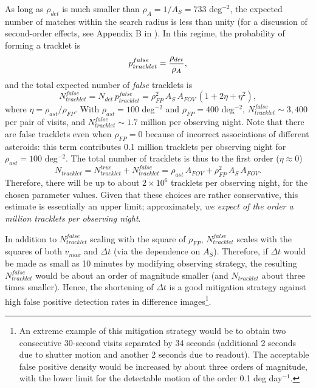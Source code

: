 As long as $\rho_{det}$ is much smaller than $\rho_A = 1/A_S = 733$ deg$^{-2}$, the expected number of 
matches within the search radius is less than unity (for a discussion of second-order effects, see Appendix B 
in \citealt{IVLZ2005}). In this regime, the probability of forming a tracklet is 
\begin{equation}
                 p_{tracklet}^{false} =   { \rho_{det}  \over \rho_A}, 
\end{equation}
and the total expected number of {\it false} tracklets is 
\begin{equation}
           N_{tracklet}^{false} = N_{det} \, p_{tracklet}^{false} =  \rho^2_{FP}  \, A_S \, A_{FOV} \,
                                \left(1 + 2 \eta + \eta^2\right),
\end{equation}
where $\eta = \rho_{ast}  / \rho_{FP}$. With $\rho_{ast} = 100$ deg$^{-2}$ and  $\rho_{FP} = 400$ deg$^{-2}$,
$N_{tracklet}^{false} \sim 3,400$ per pair of visits, and $N_{tracklet}^{false} \sim 1.7$ million per observing night. 
Note that there are false tracklets even when $\rho_{FP} = 0$ because of incorrect associations of different asteroids:
this term contributes 0.1 million tracklets per observing night for $\rho_{ast} = 100$ deg$^{-2}$. The total
number of tracklets is thus to the first order ($\eta \approx 0$)
\begin{equation}
   N_{tracklet} =  N_{tracklet}^{true} + N_{tracklet}^{false} = \rho_{ast}  \, A_{FOV} + \rho^2_{FP}  \, A_S \, A_{FOV}. 
\end{equation}
Therefore, there will be up to about $2\times10^6$ tracklets per observing night, for the chosen parameter 
values. Given that these choices are rather conservative, this estimate is essentially an upper limit;
approximately, {\it we expect of the order a million tracklets per observing night}. 


In addition to $N_{tracklet}^{false}$ scaling with the square of $\rho_{FP}$, $N_{tracklet}^{false}$ scales with the squares of
both $v_{max}$ and  $\Delta t$ (via the dependence on $A_S$). Therefore, if $\Delta t$ would be made
as small as 10 minutes by modifying observing strategy, the resulting $N_{tracklet}^{false}$ would be about an 
order of magnitude smaller (and $N_{tracklet}$ about three times smaller).  Hence, the shortening of $\Delta t$ is 
a good mitigation strategy against high false positive detection rates in difference images\footnote{An
extreme example of this mitigation strategy would be to obtain two consecutive 30-second visits separated 
by 34 seconds (additional 2 seconds due to shutter motion and another 2 seconds due to readout). 
The acceptable false positive density would be increased by about three orders of magnitude, with the
lower limit for the detectable motion of the order 0.1 deg day$^{-1}$.}.


